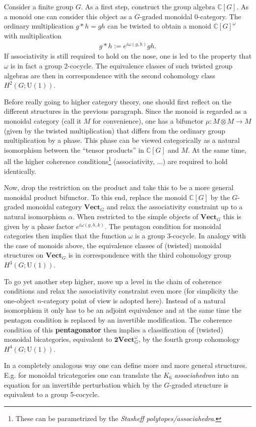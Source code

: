     Consider a finite group $G$. As a first step, construct the group algebra $\mathbb{C}[G]$. As a monoid one can consider this object as a $G$-graded monoidal 0-category. The ordinary multiplication $g\ast h=gh$ can be twisted to obtain a monoid $\mathbb{C}[G]^\omega$ with multiplication
    \begin{gather}
        g\ast h := e^{i\omega(g,h)}gh.
    \end{gather}
    If associativity is still required to hold on the nose, one is led to the property that $\omega$ is in fact a group 2-cocycle. The equivalence classes of such twisted group algebras are then in correspondence with the second cohomology class $H^2(G;\mathrm{U}(1))$.

    Before really going to higher category theory, one should first reflect on the different structures in the previous paragraph. Since the monoid is regarded as a monoidal category (call it $M$ for convenience), one has a bifunctor $\mu:M\otimes M\rightarrow M$ (given by the twisted multiplication) that differs from the ordinary group multiplication by a phase. This phase can be viewed categorically as a natural isomorphism between the ``tensor products'' in $\mathbb{C}[G]$ and $M$. At the same time, all the higher coherence conditions\footnote{These can be parametrized by the \textit{Stasheff polytopes/associahedra}.} (associativity, ...) are required to hold identically.

    Now, drop the restriction on the product and take this to be a more general monoidal product bifunctor. To this end, replace the monoid $\mathbb{C}[G]$ by the $G$-graded monoidal category $\mathbf{Vect}_G$ and relax the associativity constraint up to a natural isomorphism $\alpha$. When restricted to the simple objects of $\mathbf{Vect}_G$ this is given by a phase factor $e^{i\omega(g,h,k)}$. The pentagon condition for monoidal categories then implies that the function $\omega$ is a group 3-cocycle. In analogy with the case of monoids above, the equivalence classes of (twisted) monoidal structures on $\mathbf{Vect}_G$ is in correspondence with the third cohomology group $H^3(G;\mathrm{U}(1))$.

    To go yet another step higher, move up a level in the chain of coherence conditions and relax the associativity constraint even more (for simplicity the one-object $n$-category point of view is adopted here). Instead of a natural isomorphism it only has to be an adjoint equivalence and at the same time the pentagon condition is replaced by an invertible modification. The coherence condition of this \textbf{pentagonator} then implies a classification of (twisted) monoidal bicategories, equivalent to $\mathbf{2Vect}_G^\omega$, by the fourth group cohomology $H^4(G;\mathrm{U}(1))$.

    In a completely analogous way one can define more and more general structures. E.g. for monoidal tricategories one can translate the $K_6$ \textit{associahedron} into an equation for an invertible perturbation which by the $G$-graded structure is equivalent to a group 5-cocycle.

